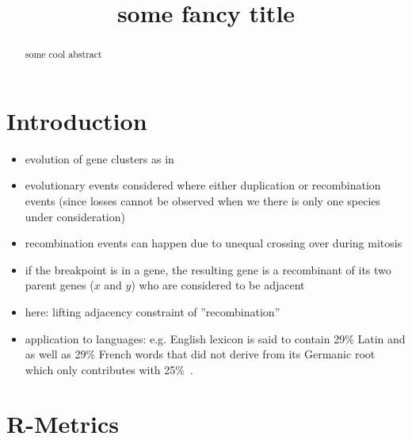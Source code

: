 \documentclass{article}
\newcommand{\TODO}[1]{\begingroup\color{red}#1\endgroup}
\begin{document}
\title{\TODO{some fancy title}}

\maketitle


\begin{abstract}
 some cool abstract
\end{abstract}

\section{Introduction}

\begin{itemize}
 \item evolution of gene clusters as in~\cite{Prohaska:17a}
 \item evolutionary events considered where either duplication 
 or recombination events (since losses cannot be observed when 
 we there is only one species under consideration)
 \item recombination events can happen due to unequal crossing
 over during mitosis
 \item if the breakpoint is in a gene, the resulting gene is
 a recombinant of its two parent genes ($x$ and $y$) who are
 considered to be adjacent
 \item here: lifting adjacency constraint of ''recombination''
 \item application to languages: e.g. English lexicon is said
 to contain 29\% Latin and as well as 29\% French words that 
 did not derive from its Germanic root which only contributes 
 with 25\%~\cite{Finkenstaedt:73}.
\end{itemize}


\section{R-Metrics} 
\end{document}
